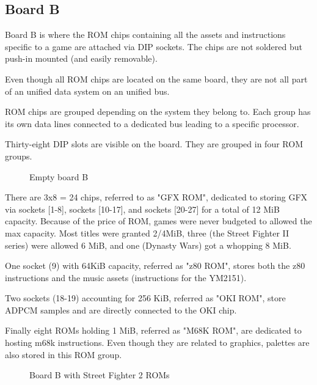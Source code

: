 \label{fig:boarda}

\label{fig:drawboarda}

\subsection{Board B}
   Board B is where the ROM chips containing all the assets and instructions specific to a game are attached via DIP sockets. The chips are not soldered but push-in mounted (and easily removable).

   Even though all ROM chips are located on the same board, they are not all part of an unified data system on an unified bus. 

   ROM chips are grouped depending on the system they belong to. Each group has its own data lines connected to a dedicated bus leading to a specific processor. 

   Thirty-eight DIP slots are visible on the board. They are grouped in four ROM groups. 

\vfill
\begin{figure}[H] \label{boardb_no_chips}
  \caption*{Empty board B}
  \end{figure}
\pagebreak

   There are 3x8 = 24 chips, referred to as "GFX ROM", dedicated to storing GFX via sockets [1-8], sockets [10-17], and sockets [20-27] for a total of 12 MiB capacity. Because of the price of ROM, games were never budgeted to allowed the max capacity. Most titles were granted 2/4MiB, three (the Street Fighter II series) were allowed 6 MiB, and one (Dynasty Wars) got a whopping 8 MiB.

   One socket (9) with 64KiB capacity, referred as "z80 ROM", stores both the z80 instructions and the music assets (instructions for the YM2151). 

   Two sockets (18-19) accounting for 256 KiB, referred as "OKI ROM", store ADPCM samples and are directly connected to the OKI chip. 

   Finally eight ROMs holding 1 MiB, referred as "M68K ROM", are dedicated to hosting m68k instructions. Even though they are related to graphics, palettes are also stored in this ROM group. 


\vfill
\begin{figure}[H]
  \caption*{Board B with Street Fighter 2 ROMs}
  \end{figure}
\pagebreak


